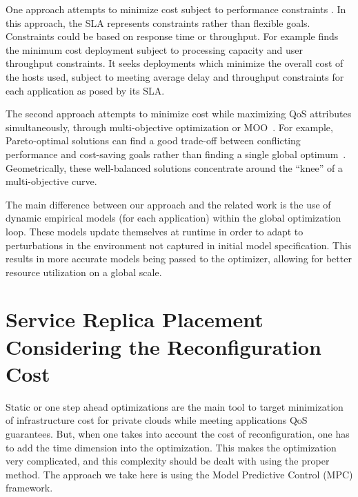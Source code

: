 One approach attempts to minimize cost subject to performance constraints
\cite{li_fast_2009,li_performance_2009}. In this approach, the SLA represents
constraints rather than flexible goals. Constraints could be based on response
time or throughput. For example \cite{li_fast_2009} finds the minimum cost
deployment subject to processing capacity and user throughput constraints. It
seeks deployments which minimize the overall cost of the hosts used, subject to meeting average delay and
throughput constraints for each application as posed by its SLA. 

The second approach attempts to minimize cost while maximizing QoS
attributes simultaneously, through multi-objective optimization or
MOO~\cite{li_sla-driven_2010}. For example, Pareto-optimal solutions can find a
good trade-off between conflicting performance and cost-saving goals rather than
 finding a single global optimum~\cite{soror_automatic_2010}. Geometrically,
 these well-balanced solutions concentrate around the ``knee'' of a
 multi-objective curve.

The main difference between our approach and the related work is the use of dynamic empirical models (for each application) within the
global optimization loop. These models update themselves at runtime in order to adapt to perturbations in the environment not captured in initial model specification.  This results in more accurate models being passed to the optimizer, allowing for better resource utilization on a global scale.  

    
\section{Service Replica Placement Considering the Reconfiguration Cost} 
\label{sec:service_replica_placement_considering_trhing_cost} 
 Static or one step ahead optimizations are the main tool to target minimization of infrastructure cost for private clouds while meeting applications QoS guarantees. But, when one takes into account the cost of reconfiguration, one has to add the time dimension into the optimization. This makes the optimization very complicated, and this complexity should be dealt with using the proper method. The approach we take here is using the Model Predictive Control (MPC) framework.  

